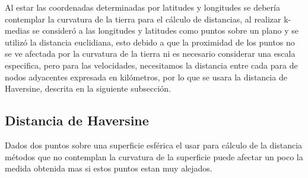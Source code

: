 \documentclass[a4paper]{article}
\begin{document}
\noindent
Al estar las coordenadas determinadas por latitudes y longitudes se debería contemplar la curvatura de la tierra para el cálculo de distancias, al realizar k-medias se consideró a las longitudes y latitudes como puntos sobre un plano y se utilizó la distancia euclidiana, esto debido a que la proximidad de los puntos no se ve afectada por la curvatura de la tierra ni es necesario considerar una escala especifica, pero para las velocidades, necesitamos la distancia entre cada para de nodos adyacentes expresada en kilómetros, por lo que se usara la distancia de Haversine, descrita en la siguiente subsección.\\

\noindent



\subsection{Distancia de Haversine}
Dados dos puntos sobre una superficie esf\'erica el usar para c\'alculo de la distancia m\'etodos que no contemplan la curvatura de la superficie puede afectar un poco la medida obtenida mas si estos puntos estan muy alejados.
\\
\end{document}
